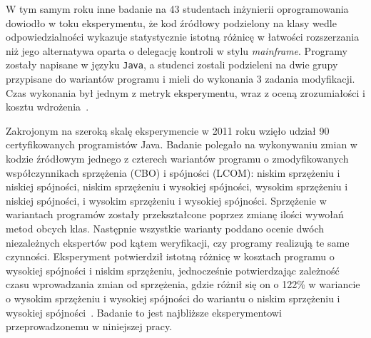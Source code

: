 W tym samym roku inne badanie na 43 studentach inżynierii oprogramowania
dowiodło w toku eksperymentu, że kod źródłowy podzielony na klasy wedle
odpowiedzialności wykazuje statystycznie istotną różnicę w łatwości
rozszerzania niż jego alternatywa oparta o delegację kontroli w stylu
\textit{mainframe}.
Programy zostały napisane w języku \texttt{Java}, a studenci zostali
podzieleni na dwie grupy przypisane do wariantów programu i mieli do
wykonania 3 zadania modyfikacji.
Czas wykonania był jednym z metryk eksperymentu, wraz z oceną zrozumiałości
i kosztu wdrożenia~\cite{deligiannis2004assessing}.

Zakrojonym na szeroką skalę eksperymencie w 2011 roku wzięło udział
90 certyfikowanych programistów Java.
Badanie polegało na wykonywaniu zmian w kodzie źródłowym jednego z czterech
wariantów programu o zmodyfikowanych współczynnikach sprzężenia
(\acrshort{CBO}) i spójności (\acrshort{LCOM}): niskim sprzężeniu i niskiej
spójności, niskim sprzężeniu i wysokiej spójności, wysokim sprzężeniu i niskiej
spójności, i wysokim sprzężeniu i wysokiej spójności.
Sprzężenie w wariantach programów zostały przekształcone poprzez zmianę ilości
wywołań metod obcych klas.
Następnie wszystkie warianty poddano ocenie dwóch niezależnych ekspertów pod
kątem weryfikacji, czy programy realizują te same czynności.
Eksperyment potwierdził istotną różnicę w kosztach programu o wysokiej spójności
i niskim sprzężeniu, jednocześnie potwierdzając zależność czasu wprowadzania
zmian od sprzężenia, gdzie różnił się on o 122\% w wariancie o wysokim
sprzężeniu i wysokiej spójności do wariantu o niskim sprzężeniu i wysokiej
spójności~\cite{ramasubbu2011structural}.
Badanie to jest najbliższe eksperymentowi przeprowadzonemu w niniejszej pracy.


